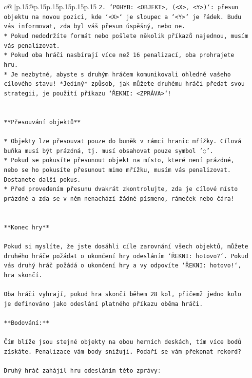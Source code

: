 \documentclass{article}
\begin{document}
{\begin{supertabular}{c@{$\;$}|p{.15\linewidth}@{}p{.15\linewidth}p{.15\linewidth}p{.15\linewidth}p{.15\linewidth}p{.15\linewidth}}
{{{\texttt{2. `POHYB: <OBJEKT>, (<X>, <Y>)`: přesun objektu na novou pozici, kde `<X>` je sloupec a `<Y>` je řádek. Budu vás informovat, zda byl váš přesun úspěšný, nebo ne.} \\
\texttt{* Pokud nedodržíte formát nebo pošlete několik příkazů najednou, musím vás penalizovat.} \\
\texttt{* Pokud oba hráči nasbírají více než 16 penalizací, oba prohrajete hru.} \\
\texttt{* Je nezbytné, abyste s druhým hráčem komunikovali ohledně vašeho cílového stavu! *Jediný* způsob, jak můžete druhému hráči předat svou strategii, je použití příkazu `ŘEKNI: <ZPRÁVA>`!} \\
\\ 
\\ 
\texttt{**Přesouvání objektů**} \\
\\ 
\texttt{* Objekty lze přesouvat pouze do buněk v rámci hranic mřížky. Cílová buňka musí být prázdná, tj. musí obsahovat pouze symbol '◌'.} \\
\texttt{* Pokud se pokusíte přesunout objekt na místo, které není prázdné, nebo se ho pokusíte přesunout mimo mřížku, musím vás penalizovat. Dostanete další pokus.} \\
\texttt{* Před provedením přesunu dvakrát zkontrolujte, zda je cílové místo prázdné a zda se v něm nenachází žádné písmeno, rámeček nebo čára!} \\
\\ 
\\ 
\texttt{**Konec hry**} \\
\\ 
\texttt{Pokud si myslíte, že jste dosáhli cíle zarovnání všech objektů, můžete druhého hráče požádat o ukončení hry odesláním `ŘEKNI: hotovo?`. Pokud vás druhý hráč požádá o ukončení hry a vy odpovíte `ŘEKNI: hotovo!`, hra skončí.} \\
\\ 
\texttt{Oba hráči vyhrají, pokud hra skončí během 28 kol, přičemž jedno kolo je definováno jako odeslání platného příkazu oběma hráči.} \\
\\ 
\texttt{**Bodování:**} \\
\\ 
\texttt{Čím blíže jsou stejné objekty na obou herních deskách, tím více bodů získáte. Penalizace vám body snižují. Podaří se vám překonat rekord?} \\
\\ 
\texttt{Druhý hráč zahájil hru odesláním této zprávy:} \\
}}}
\end{supertabular}}
\end{document}
